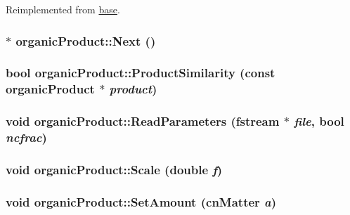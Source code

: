 Reimplemented from \hyperlink{classbase_ad2f5f5c9ec517641f63e52646cf49ad9}{base}.\hypertarget{classorganic_product_ae07714fe698c3da48f1840242ffe7a04}{
\subsubsection[{Next}]{$\ast$ organicProduct::Next ()}}
\label{classorganic_product_ae07714fe698c3da48f1840242ffe7a04}
\hypertarget{classorganic_product_aeafa792e066d2bfa04029019c94d2d6c}{
\subsubsection[{ProductSimilarity}]{\setlength{\rightskip}{0pt plus 5cm}bool organicProduct::ProductSimilarity (const {\bf organicProduct} $\ast$ {\em product})}}
\label{classorganic_product_aeafa792e066d2bfa04029019c94d2d6c}
\hypertarget{classorganic_product_acea84ea54c011ee842e7a90ae3fabcec}{
\subsubsection[{ReadParameters}]{\setlength{\rightskip}{0pt plus 5cm}void organicProduct::ReadParameters (fstream $\ast$ {\em file}, \/  bool {\em ncfrac})}}
\label{classorganic_product_acea84ea54c011ee842e7a90ae3fabcec}
\hypertarget{classorganic_product_aafe75e4ad827977c8f3679850581d19a}{
\subsubsection[{Scale}]{\setlength{\rightskip}{0pt plus 5cm}void organicProduct::Scale (double {\em f})}}
\label{classorganic_product_aafe75e4ad827977c8f3679850581d19a}
\hypertarget{classorganic_product_a37de4c556fd969898cdf6af1375a7542}{
\subsubsection[{SetAmount}]{\setlength{\rightskip}{0pt plus 5cm}void organicProduct::SetAmount ({\bf cnMatter} {\em a})}}
